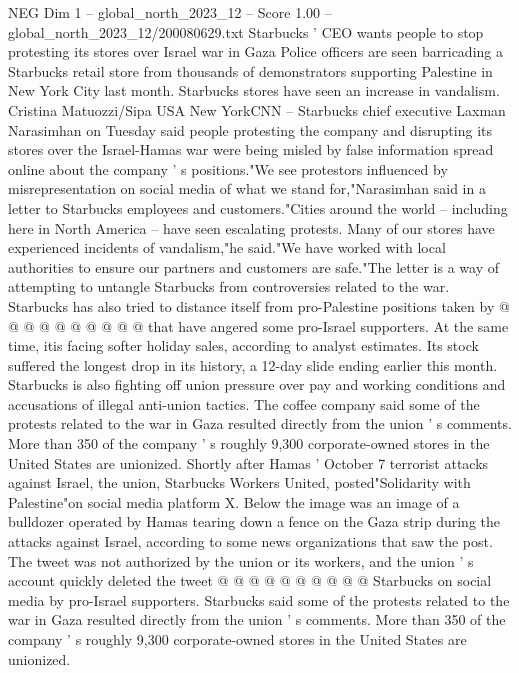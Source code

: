 \begin{textsample}{NEG Dim 1 – global\_north\_2023\_12 – Score 1.00 – global\_north\_2023\_12/200080629.txt}  \label{ex:f1_neg_206}
Starbucks ' CEO wants people to stop protesting its stores over Israel war in Gaza Police officers are seen barricading a Starbucks retail store from thousands of demonstrators supporting Palestine in New York City last month.
Starbucks stores have seen an increase in vandalism.
Cristina Matuozzi/Sipa USA New YorkCNN -- Starbucks chief executive Laxman Narasimhan on Tuesday said people protesting the company and disrupting its stores over the Israel-Hamas war were being misled by false information spread online about the company ' s positions."We see protestors influenced by misrepresentation on social media of what we stand for,"Narasimhan said in a letter to Starbucks employees and customers."Cities around the world -- including here in North America -- have seen escalating protests.
Many of our stores have experienced incidents of vandalism,"he said."We have worked with local authorities to ensure our partners and customers are safe."The letter is a way of attempting to untangle Starbucks from controversies related to the war.
Starbucks has also tried to distance itself from pro-Palestine positions taken by @ @ @ @ @ @ @ @ @ @ that have angered some pro-Israel supporters.
At the same time, itis facing softer holiday sales, according to analyst estimates.
Its stock suffered the longest drop in its history, a 12-day slide ending earlier this month.
Starbucks is also fighting off union pressure over pay and working conditions and accusations of illegal anti-union tactics.
The coffee company said some of the protests related to the war in Gaza resulted directly from the union ' s comments.
More than 350 of the company ' s roughly 9,300 corporate-owned stores in the United States are unionized.
Shortly after Hamas ' October 7 terrorist attacks against Israel, the union, Starbucks Workers United, posted"Solidarity with Palestine"on social media platform X.
Below the image was an image of a bulldozer operated by Hamas tearing down a fence on the Gaza strip during the attacks against Israel, according to some news organizations that saw the post.
The tweet was not authorized by the union or its workers, and the union ' s account quickly deleted the tweet @ @ @ @ @ @ @ @ @ @ Starbucks on social media by pro-Israel supporters.
Starbucks said some of the protests related to the war in Gaza resulted directly from the union ' s comments.
More than 350 of the company ' s roughly 9,300 corporate-owned stores in the United States are unionized.

\end{textsample}
